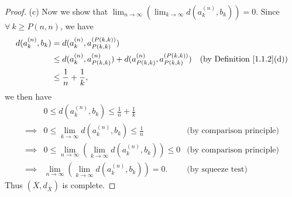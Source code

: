 \begin{proof}{(c)}
    Now we show that \(\lim_{n \to \infty} (\lim_{k \to \infty} d(a_k^{(n)}, b_k)) = 0\).
    Since \(\forall\ k \geq P(n, n)\), we have
    \begin{align*}
        d(a_k^{(n)}, b_k) & = d(a_k^{(n)}, a_{P(k, k)}^{(P(k, k))})                                                                                      \\
                          & \leq d(a_k^{(n)}, a_{P(k, k)}^{(n)}) + d(a_{P(k, k)}^{(n)}, a_{P(k, k)}^{(P(k, k))}) & \text{(by Definition \ref{1.1.2}(d))} \\
                          & \leq \frac{1}{n} + \frac{1}{k},
    \end{align*}
    we then have
    \begin{align*}
                 & 0 \leq d(a_k^{(n)}, b_k) \leq \frac{1}{n} + \frac{1}{k}                                                      \\
        \implies & 0 \leq \lim_{k \to \infty} d(a_k^{(n)}, b_k) \leq \frac{1}{n}             & \text{(by comparison principle)} \\
        \implies & 0 \leq \lim_{n \to \infty} (\lim_{k \to \infty} d(a_k^{(n)}, b_k)) \leq 0 & \text{(by comparison principle)} \\
        \implies & \lim_{n \to \infty} (\lim_{k \to \infty} d(a_k^{(n)}, b_k)) = 0.          & \text{(by squeeze test)}
    \end{align*}
    Thus \((\overline{X}, d_{\overline{X}})\) is complete.
\end{proof}
